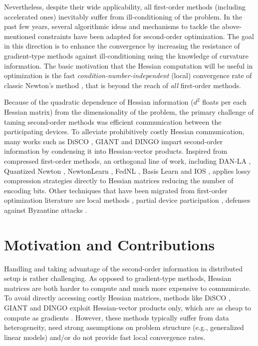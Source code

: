 \documentclass[11pt]{article}
\begin{document}
	
	Nevertheless, despite their wide applicability, all first-order methods (including accelerated ones) inevitably suffer from ill-conditioning of the problem. In the past few years, several algorithmic ideas and mechanisms to tackle the above-mentioned constraints have been adapted for second-order optimization. The goal in this direction is to enhance the convergence by increasing the resistance of gradient-type methods against ill-conditioning using the knowledge of curvature information. The basic motivation that the Hessian computation will be useful in optimization is the fast {\em condition-number-independent} (local) convergence rate of classic Newton's method \citep{Beck-book-nonlinear}, that is beyond the reach of {\em all} first-order methods.
	
	Because of the quadratic dependence of Hessian information ($d^2$ floats per each Hessian matrix) from the dimensionality of the problem, the primary challenge of taming second-order methods was efficient communication between the participating devices. To alleviate prohibitively costly Hessian communication, many works such as DiSCO \citep{DiSCO2015,Zhuang2015,Lin2014LargescaleLR,Newton-MR2019}, GIANT \citep{GIANT2018,DANE,Reddi:2016aide} and DINGO \citep{DINGO,CompressesDINGO2020} impart second-order information by condensing it into Hessian-vector products. Inspired from compressed first-order methods, an orthogonal line of work, including DAN-LA \citep{DAN-LA2020}, Quantized Newton \citep{Alimisis2021QNewton}, NewtonLearn \citep{Islamov2021NewtonLearn}, FedNL \citep{FedNL2021}, Basis Learn \citep{qian2021basis} and IOS \citep{IOSFabbro2022}, applies lossy compression strategies directly to Hessian matrices reducing the number of encoding bits. Other techniques that have been migrated from first-order optimization literature are local methods \citep{LocalNewton2021}, partial device participation \citep{FedNL2021,qian2021basis}, defenses against Byzantine attacks \citep{Ghosh2020ByzantineNewton,Ghosh2021ByzantineNewton}.
	
	
	
	\section{Motivation and Contributions}
	
	Handling and taking advantage of the second-order information in distributed setup is rather challenging. As opposed to gradient-type methods, Hessian matrices are both harder to compute and much more expensive to communicate. To avoid directly accessing costly Hessian matrices, methods like DiSCO \citep{DiSCO2015}, GIANT \citep{GIANT2018} and DINGO \citep{DINGO} exploit Hessian-vector products only, which are as cheap to compute as gradients \citep{HessianXvector1994}. However, these methods typically suffer from data heterogeneity, need strong assumptions on problem structure (e.g., generalized linear models) and/or do not provide fast local convergence rates.
	
\end{document}
